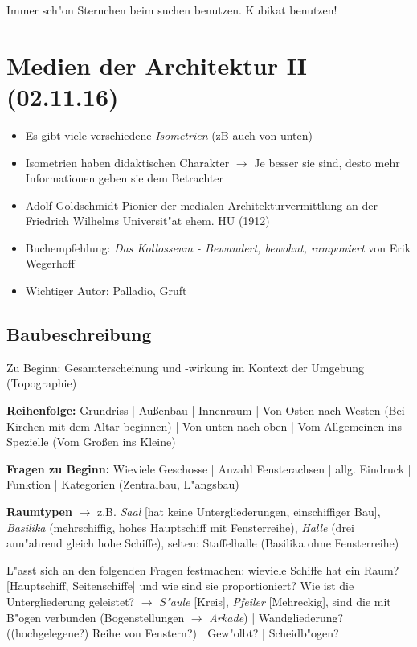 \documentclass[]{scrartcl}
\begin{document}
Immer sch"on Sternchen beim suchen benutzen.
Kubikat benutzen!


\section{Medien der Architektur II\\(02.11.16)}

\begin{itemize}
  \item Es gibt viele verschiedene \emph{Isometrien} (zB auch von unten)
  \item Isometrien haben didaktischen Charakter $\rightarrow$ Je besser sie sind, desto mehr Informationen geben sie dem Betrachter
  \item Adolf Goldschmidt Pionier der medialen Architekturvermittlung an der Friedrich Wilhelms Universit"at ehem. HU (1912)
  \item Buchempfehlung: \emph{Das Kollosseum - Bewundert, bewohnt, ramponiert} von Erik Wegerhoff
  \item Wichtiger Autor: Palladio, Gruft
\end{itemize}

\subsection{Baubeschreibung}

Zu Beginn: Gesamterscheinung und -wirkung im Kontext der Umgebung (Topographie)


\textbf{Reihenfolge:} Grundriss | Au\ss enbau | Innenraum | Von Osten nach Westen (Bei Kirchen mit dem Altar beginnen) | Von unten nach oben | Vom Allgemeinen ins Spezielle (Vom Gro\ss en ins Kleine)

\textbf{Fragen zu Beginn:} Wieviele Geschosse | Anzahl Fensterachsen | allg. Eindruck | Funktion | Kategorien (Zentralbau, L"angsbau) 

\textbf{Raumtypen} $\rightarrow$ z.B. \emph{Saal} [hat keine Untergliederungen, einschiffiger Bau], \emph{Basilika} (mehrschiffig, hohes Hauptschiff mit Fensterreihe), \emph{Halle} (drei ann"ahrend gleich hohe Schiffe), selten: Staffelhalle (Basilika ohne Fensterreihe)

L"asst sich an den folgenden Fragen festmachen: wieviele Schiffe hat ein Raum? [Hauptschiff, Seitenschiffe] und wie sind sie proportioniert? Wie ist die Untergliederung geleistet? $\rightarrow$ \emph{S"aule} [Kreis], \emph{Pfeiler} [Mehreckig], sind die mit B"ogen verbunden (Bogenstellungen $\rightarrow$ \emph{Arkade}) | Wandgliederung? ((hochgelegene?) Reihe von Fenstern?) | Gew"olbt? | Scheidb"ogen? 
\end{document}
